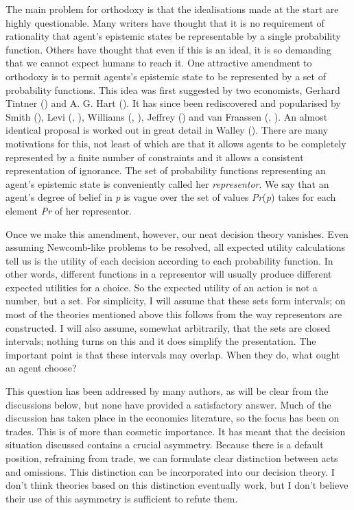 \documentclass[
  10pt,
  letterpaper,
  DIV=11,
  numbers=noendperiod,
  twoside]{scrartcl}
\begin{document}
The main problem for orthodoxy is that the idealisations made at the
start are highly questionable. Many writers have thought that it is no
requirement of rationality that agent's epistemic states be
representable by a single probability function. Others have thought that
even if this is an ideal, it is so demanding that we cannot expect
humans to reach it. One attractive amendment to orthodoxy is to permit
agents's epistemic state to be represented by a set of probability
functions. This idea was first suggested by two economists, Gerhard
Tintner () and A. G. Hart
(). It has since been rediscovered and
popularised by Smith (), Levi
(, ), Williams
(, ),
Jeffrey () and van Fraassen
(,
). An almost identical proposal is
worked out in great detail in Walley ().
There are many motivations for this, not least of which are that it
allows agents to be completely represented by a finite number of
constraints and it allows a consistent representation of ignorance. The
set of probability functions representing an agent's epistemic state is
conveniently called her \emph{representor}. We say that an agent's
degree of belief in \emph{p} is vague over the set of values
\emph{Pr}(\emph{p}) takes for each element \emph{Pr} of her representor.

Once we make this amendment, however, our neat decision theory vanishes.
Even assuming Newcomb-like problems to be resolved, all expected utility
calculations tell us is the utility of each decision according to each
probability function. In other words, different functions in a
representor will usually produce different expected utilities for a
choice. So the expected utility of an action is not a number, but a set.
For simplicity, I will assume that these sets form intervals; on most of
the theories mentioned above this follows from the way representors are
constructed. I will also assume, somewhat arbitrarily, that the sets are
closed intervals; nothing turns on this and it does simplify the
presentation. The important point is that these intervals may overlap.
When they do, what ought an agent choose?

This question has been addressed by many authors, as will be clear from
the discussions below, but none have provided a satisfactory answer.
Much of the discussion has taken place in the economics literature, so
the focus has been on trades. This is of more than cosmetic importance.
It has meant that the decision situation discussed contains a crucial
asymmetry. Because there is a default position, refraining from trade,
we can formulate clear distinction between acts and omissions. This
distinction can be incorporated into our decision theory. I don't think
theories based on this distinction eventually work, but I don't believe
their use of this asymmetry is sufficient to refute them.
\end{document}
